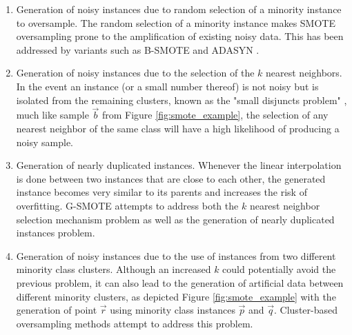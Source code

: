 \begin{enumerate}
    \item Generation of noisy instances due to random selection of a
        minority instance to oversample. The random
        selection of a minority instance makes SMOTE
        oversampling prone to the amplification of existing noisy data. This
        has been addressed by variants such as B-SMOTE \cite{Han2005} and
        ADASYN \cite{HaiboHe2008}. 

    \item Generation of noisy instances due to the selection of the $k$
        nearest neighbors. In the event an instance
        (or a small number thereof) is not noisy but is isolated from the
        remaining clusters, known as the "small disjuncts problem"
        \cite{holte1989}, much like sample $\overrightarrow{b}$ from Figure
        \ref{fig:smote_example}, the selection of any nearest neighbor of the
        same class will have a high likelihood of producing a noisy sample.

    \item Generation of nearly duplicated instances. Whenever the linear
        interpolation is done between two instances that are close to each
        other, the generated instance becomes very similar to its parents and
        increases the risk of overfitting. G-SMOTE \cite{Douzas2019} attempts
        to address both the $k$ nearest neighbor selection mechanism problem
        as well as the generation of nearly duplicated instances problem. 

    \item Generation of noisy instances due to the use of
        instances from two different minority class clusters.
        Although an increased $k$ could potentially avoid the previous
        problem, it can also lead to the generation of artificial data between
        different minority clusters, as depicted Figure
        \ref{fig:smote_example} with the generation of point
        $\overrightarrow{r}$ using minority class instances $\overrightarrow{p}$ and $\overrightarrow{q}$.
        Cluster-based oversampling methods attempt to address this problem. 
\end{enumerate}

